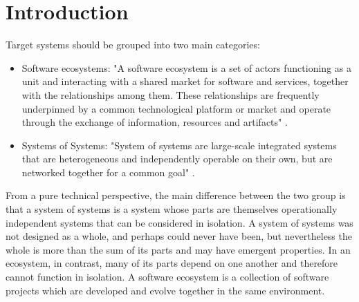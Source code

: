 \chapter{Introduction}\label{ch:introduction}
Target systems should be grouped into two main categories:
 
\begin{itemize}
  \item Software ecosystems: "A software ecosystem is a set of actors functioning as a
unit and interacting with a shared market for software and services, together
with the relationships among them. These relationships are frequently
underpinned by a common technological platform or market and operate through the
exchange of information, resources and artifacts" \cite{jansen_sense_2009}.
\item Systems of Systems: "System of systems are large-scale
integrated systems that are heterogeneous and independently operable on their
own, but are networked together for a common goal" \cite{janishidi_system_2008}.
\end{itemize}                   	
                                                               	
From a pure technical perspective, the main difference  between the two group is
that a system of systems is a system whose parts are themselves operationally
independent systems that can be considered in isolation. A system of systems was
not designed as a whole, and perhaps could never have been, but nevertheless the
whole is more than the sum of its parts and may have emergent properties. In an
ecosystem, in contrast, many of its parts depend on one another and therefore
cannot function in isolation. A software ecosystem is a collection of software
projects which are developed and evolve together in the same environment.


